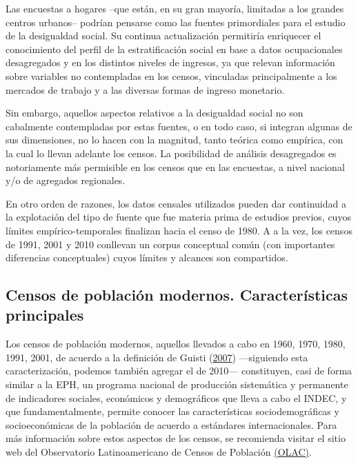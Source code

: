 \documentclass[
]{article}
\begin{document}
Las encuestas a hogares --que están, en su gran mayoría, limitadas a los grandes centros urbanos-- podrían pensarse como las fuentes primordiales para el estudio de la desigualdad social. Su continua actualización permitiría enriquecer el conocimiento del perfil de la estratificación social en base a datos ocupacionales desagregados y en los distintos niveles de ingresos, ya que relevan información sobre variables no contempladas en los censos, vinculadas principalmente a los mercados de trabajo y a las diversas formas de ingreso monetario.

Sin embargo, aquellos aspectos relativos a la desigualdad social no son cabalmente contempladas por estas fuentes, o en todo caso, si integran algunas de sus dimensiones, no lo hacen con la magnitud, tanto teórica como empírica, con la cual lo llevan adelante los censos. La posibilidad de análisis desagregados es notoriamente más permisible en los censos que en las encuestas, a nivel nacional y/o de agregados regionales.

En otro orden de razones, los datos censales utilizados pueden dar continuidad a la explotación del tipo de fuente que fue materia prima de estudios previos, cuyos límites empírico-temporales finalizan hacia el censo de 1980. A a la vez, los censos de 1991, 2001 y 2010 conllevan un corpus conceptual común (con importantes diferencias conceptuales) cuyos límites y alcances son compartidos.

\hypertarget{censos}{%
\subsection{Censos de población modernos. Características principales}\label{censos}}

Los censos de población modernos, aquellos llevados a cabo en 1960, 1970, 1980, 1991, 2001, de acuerdo a la definición de Guisti (\protect\hyperlink{ref-Giusti2007}{2007}) ---siguiendo esta caracterización, podemos también agregar el de 2010--- constituyen, casi de forma similar a la EPH, un programa nacional de producción sistemática y permanente de indicadores sociales, económicos y demográficos que lleva a cabo el INDEC, y que fundamentalmente, permite conocer las características sociodemográficas y socioeconómicas de la población de acuerdo a estándares internacionales. Para más información sobre estos aspectos de los censos, se recomienda visitar el sitio web del Observatorio Latinoamericano de Censos de Población \href{https://observatoriocensal.org/}{(OLAC)}.
\end{document}
